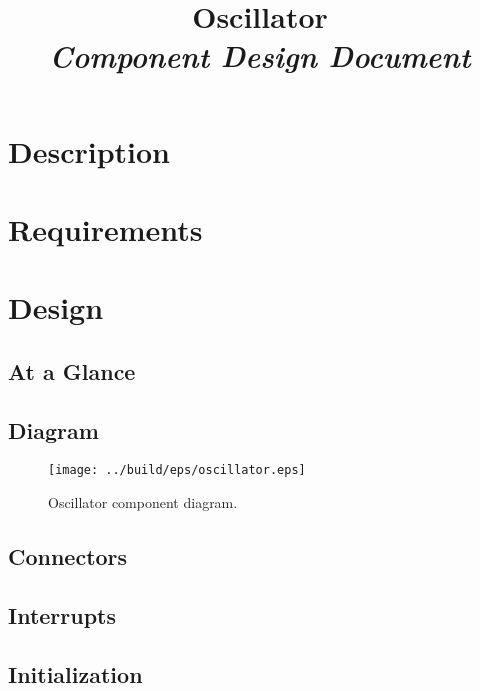 



\title{\textbf{Oscillator} \\
\large\textit{Component Design Document}}
\date{}
\maketitle

\section{Description}


\section{Requirements}


\section{Design}

\subsection{At a Glance}


\subsection{Diagram}
\begin{figure}[H]
  \texttt{[image: ../build/eps/oscillator.eps]}
  \caption{Oscillator component diagram.}
\end{figure}

\subsection{Connectors}


\subsection{Interrupts}



\subsection{Initialization}



